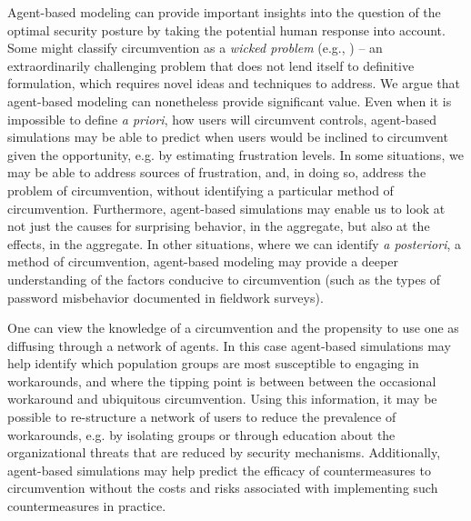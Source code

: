 \documentclass{acm_proc_article-sp}
\newcommand{\ignore}[1] {}
\begin{document}
Agent-based modeling can provide important insights into the question
of the optimal security posture by taking the potential human response
into account.  Some might classify circumvention as a \textit{wicked
  problem} (e.g., \cite{rittel1973dilemmas}) -- an extraordinarily
challenging problem that does not lend itself to definitive
formulation, which requires novel ideas and techniques to address.  We
argue that agent-based modeling can nonetheless provide significant
value.  Even when it is impossible to define \textit{a priori}, how users will
circumvent controls, agent-based simulations may be able to predict
when users would be inclined to circumvent given the opportunity,
e.g. by estimating frustration levels.  In some situations, we may be
able to address sources of frustration, and, in doing so, address the
problem of circumvention, without identifying a particular method of
circumvention. Furthermore, agent-based simulations may enable us to
look at not just the causes for surprising behavior, in the aggregate,
but also at the effects, in the aggregate.  In other situations, where
we can identify \textit{a posteriori}, a method of circumvention,
agent-based modeling may provide a deeper understanding of the factors
conducive to circumvention (such as the types of password misbehavior
documented in fieldwork surveys).


One can view the knowledge of a circumvention and the propensity to
use one as diffusing through a network of agents. In this case
agent-based simulations may help identify which population groups are
most susceptible to engaging in workarounds, and where the tipping
point is between between the occasional workaround and ubiquitous
circumvention.  Using this information, it may be possible to
re-structure a network of users to reduce the prevalence of
workarounds, e.g. by isolating groups or through education about the
organizational threats that are reduced by security mechanisms.
Additionally, agent-based simulations may help predict the efficacy of
countermeasures to circumvention without the costs and risks
associated with implementing such countermeasures in practice.


\ignore{Agent models of human behavior might be an effective way to better
predict the impact of a security system in a given environment. These
models may predict otherwise unexpected outcomes due to individual
circumvention or emergent effects when a group of users collaborate
over a network.}
\end{document}
